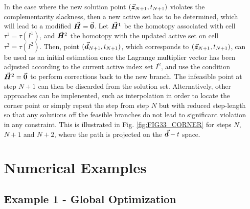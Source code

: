 In the case where the new solution point $(\vec{\boldsymbol{z}}_{N+1},t_{N+1})$ violates
the complementarity slackness, then a new active set has to be determined, which
will lead to a modified $\vec{\boldsymbol{H}}=\vec{\boldsymbol{0}}$. Let $\vec{\boldsymbol{H}}^1$ be the homotopy
associated with cell $\tau^1=\tau(I^1)$, and $\vec{\boldsymbol{H}}^2$ the homotopy with the
updated active set on cell $\tau^2=\tau(I^2)$. Then, point
$(\vec{\boldsymbol{d}}_{N+1},t_{N+1})$, which corresponds to $(\vec{\boldsymbol{z}}_{N+1},t_{N+1})$,
can be used as an initial estimation once the Lagrange multiplier vector has
been adjusted according to the current active index set $I^2$, and use
the condition $\vec{\boldsymbol{H}}^2=\vec{\boldsymbol{0}}$ to perform corrections back to the new 
branch.
The infeasible point at step $N+1$ can then be discarded from the solution set.
Alternatively, other approaches can be implenented, such as interpolation in
order to locate the corner point or simply repeat the step from step $N$ but
with reduced step-length so that any solutions off the feasible branches do not
lead to significant violation in any constraint. This is illustrated in Fig.
\ref{fig:FIG33_CORNER}
for steps $N$, $N+1$ and $N+2$, where the path is projected on the
$\vec{\boldsymbol{d}}-t$ space.

\section{Numerical Examples}\label{CH4-S4}

\subsection{Example 1 - Global Optimization}\label{CH4-EX1}

